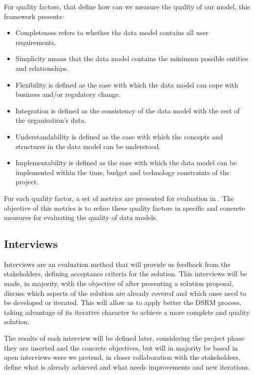For quality factors, that define how can we measure the quality of our model, this framework presents:

\begin{itemize}
\item Completeness refers to whether the data model contains all user requirements.
\item Simplicity means that the data model contains the minimum possible entities and relationships.
\item Flexibility is defined as the ease with which the data model can cope with business and/or regulatory change.
\item Integration is defined as the consistency of the data model with the rest of the organisation’s data.
\item Understandability is defined as the ease with which the concepts and structures in the data model can be understood.
\item Implementability is defined as the ease with which the data model can be implemented within the time, budget and technology constraints of the project.
\end{itemize}

For each quality factor, a set of metrics are presented for evaluation in \cite{moody1998metrics}. The objective of this metrics is to refine these quality factors in specific and concrete measures for evaluating the quality of data models. 

\subsection{Interviews}

Interviews are an evaluation method that will provide us feedback from the stakeholders, defining acceptance criteria for the solution. This interviews will be made, in majority, with the objective of after presenting a solution proposal, discuss which aspects of the solution are already covered and which ones need to be developed or iterated. This will allow us to apply better the DSRM process, taking advantage of its iterative character to achieve a more complete and quality solution.\par
The results of each interview will be defined later, considering the project phase they are inserted and the concrete objectives, but will in majority be based in open interviews were we pretend, in closer collaboration with the stakeholders, define what is already achieved and what needs improvements and new iterations.  

